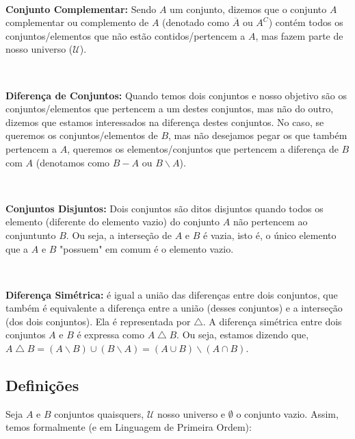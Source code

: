 $\qquad$

\textbf{Conjunto Complementar:} Sendo $A$ um conjunto, dizemos que o conjunto $A$ complementar ou complemento de $A$ (denotado como $\overline A$ ou $A^C$) contém todos os conjuntos/elementos que não estão contidos/pertencem a $A$, mas fazem parte de nosso universo ($\mathcal U$).

$\qquad$

\textbf{Diferença de Conjuntos:} Quando temos dois conjuntos e nosso objetivo são os conjuntos/elementos que pertencem a um destes conjuntos, mas não do outro, dizemos que estamos interessados na diferença destes conjuntos. No caso, se queremos os conjuntos/elementos de $B$, mas não desejamos pegar os que também pertencem a $A$, queremos os elementos/conjuntos que pertencem a diferença de $B$ com $A$ (denotamos como $B-A$ ou $B \backslash A$).

$\qquad$

\textbf{Conjuntos Disjuntos:} Dois conjuntos são ditos disjuntos quando todos os elemento (diferente do elemento vazio) do conjunto $A$ não pertencem ao conjuntunto $B$. Ou seja, a interseção de $A$ e $B$ é vazia, isto é, o único elemento que a $A$ e $B$ "possuem" em comum é o elemento vazio.

$\qquad$

\textbf{Diferença Simétrica:} é igual a união das diferenças entre dois conjuntos, que também é equivalente a diferença entre a união (desses conjuntos) e a interseção (dos dois conjuntos). Ela é representada por $\bigtriangleup$. A diferença simétrica entre dois conjuntos $A$ e $B$ é expressa como $A \bigtriangleup B$. Ou seja, estamos dizendo que, $A \bigtriangleup B = (A \backslash B) \cup (B\backslash A) = (A \cup B) \backslash (A \cap B)$.

\subsection{Definições}

Seja $A$ e $B$ conjuntos quaisquers, $\mathcal{U}$ nosso universo e $\emptyset$ o conjunto vazio. Assim, temos formalmente (e em Linguagem de Primeira Ordem):

